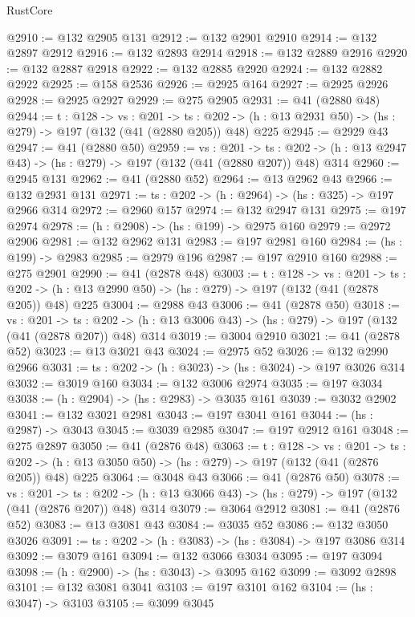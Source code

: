 \begin{lexlean}{RustCore}
\begin{coremodule}
@2910 := @132 @2905 @131
@2912 := @132 @2901 @2910
@2914 := @132 @2897 @2912
@2916 := @132 @2893 @2914
@2918 := @132 @2889 @2916
@2920 := @132 @2887 @2918
@2922 := @132 @2885 @2920
@2924 := @132 @2882 @2922
@2925 := @158 @2536
@2926 := @2925 @164
@2927 := @2925 @2926
@2928 := @2925 @2927
@2929 := @275 @2905
@2931 := @41 (@2880 @48)
@2944 := {t : @128} ->
  {vs : @201} ->
  {ts : @202} -> (h : @13 @2931 @50) -> (hs : @279) -> @197 (@132 (@41 (@2880 @205)) @48) @225
@2945 := @2929 @43
@2947 := @41 (@2880 @50)
@2959 := {vs : @201} ->
  {ts : @202} -> (h : @13 @2947 @43) -> (hs : @279) -> @197 (@132 (@41 (@2880 @207)) @48) @314
@2960 := @2945 @131
@2962 := @41 (@2880 @52)
@2964 := @13 @2962 @43
@2966 := @132 @2931 @131
@2971 := {ts : @202} -> (h : @2964) -> (hs : @325) -> @197 @2966 @314
@2972 := @2960 @157
@2974 := @132 @2947 @131
@2975 := @197 @2974
@2978 := (h : @2908) -> (hs : @199) -> @2975 @160
@2979 := @2972 @2906
@2981 := @132 @2962 @131
@2983 := @197 @2981 @160
@2984 := (hs : @199) -> @2983
@2985 := @2979 @196
@2987 := @197 @2910 @160
@2988 := @275 @2901
@2990 := @41 (@2878 @48)
@3003 := {t : @128} ->
  {vs : @201} ->
  {ts : @202} -> (h : @13 @2990 @50) -> (hs : @279) -> @197 (@132 (@41 (@2878 @205)) @48) @225
@3004 := @2988 @43
@3006 := @41 (@2878 @50)
@3018 := {vs : @201} ->
  {ts : @202} -> (h : @13 @3006 @43) -> (hs : @279) -> @197 (@132 (@41 (@2878 @207)) @48) @314
@3019 := @3004 @2910
@3021 := @41 (@2878 @52)
@3023 := @13 @3021 @43
@3024 := @2975 @52
@3026 := @132 @2990 @2966
@3031 := {ts : @202} -> (h : @3023) -> (hs : @3024) -> @197 @3026 @314
@3032 := @3019 @160
@3034 := @132 @3006 @2974
@3035 := @197 @3034
@3038 := (h : @2904) -> (hs : @2983) -> @3035 @161
@3039 := @3032 @2902
@3041 := @132 @3021 @2981
@3043 := @197 @3041 @161
@3044 := (hs : @2987) -> @3043
@3045 := @3039 @2985
@3047 := @197 @2912 @161
@3048 := @275 @2897
@3050 := @41 (@2876 @48)
@3063 := {t : @128} ->
  {vs : @201} ->
  {ts : @202} -> (h : @13 @3050 @50) -> (hs : @279) -> @197 (@132 (@41 (@2876 @205)) @48) @225
@3064 := @3048 @43
@3066 := @41 (@2876 @50)
@3078 := {vs : @201} ->
  {ts : @202} -> (h : @13 @3066 @43) -> (hs : @279) -> @197 (@132 (@41 (@2876 @207)) @48) @314
@3079 := @3064 @2912
@3081 := @41 (@2876 @52)
@3083 := @13 @3081 @43
@3084 := @3035 @52
@3086 := @132 @3050 @3026
@3091 := {ts : @202} -> (h : @3083) -> (hs : @3084) -> @197 @3086 @314
@3092 := @3079 @161
@3094 := @132 @3066 @3034
@3095 := @197 @3094
@3098 := (h : @2900) -> (hs : @3043) -> @3095 @162
@3099 := @3092 @2898
@3101 := @132 @3081 @3041
@3103 := @197 @3101 @162
@3104 := (hs : @3047) -> @3103
@3105 := @3099 @3045

\end{coremodule}
\end{lexlean}
